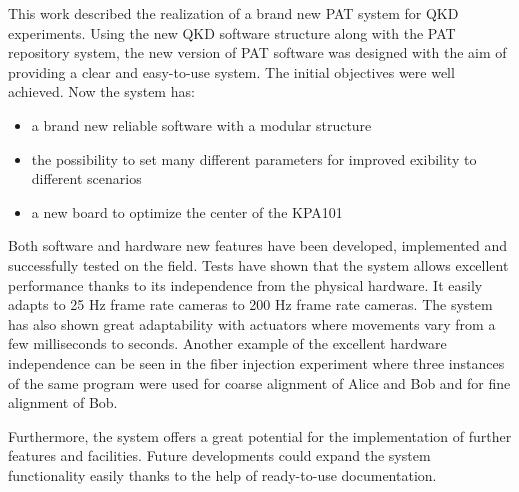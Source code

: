 This work described the realization of a brand new PAT system for QKD experiments. Using the new QKD software structure along with the PAT repository system, the new version of PAT software was designed with the aim of providing a clear and easy-to-use system. The initial objectives were well achieved. Now the system has:
\begin{itemize}
  \item a brand new reliable software with a modular structure
  \item the possibility to set many different parameters for improved exibility to different scenarios
  \item a new board to optimize the center of the KPA101
\end{itemize}
Both software and hardware new features have been developed, implemented and
successfully tested on the field. Tests have shown that the system allows excellent performance thanks to its independence from the physical hardware. It easily adapts to 25 Hz frame rate cameras to 200 Hz frame rate cameras. The system has also shown great adaptability with actuators where movements vary from a few milliseconds to seconds. Another example of the excellent hardware independence can be seen in the fiber injection experiment where three instances of the same program were used for coarse alignment of Alice and Bob and for fine alignment of Bob.

Furthermore, the system offers a great potential for the implementation of further
features and facilities. Future developments could expand the system functionality easily thanks to the help of ready-to-use documentation.